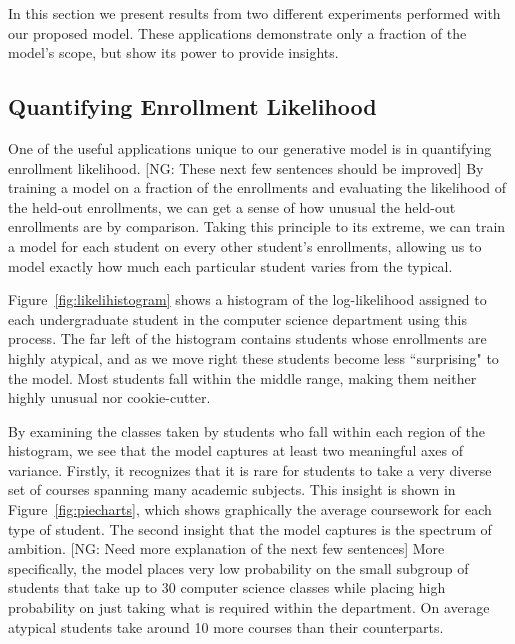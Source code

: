 \documentclass{edm_template}
\providecommand{\nvg}[1]{{\color{red} [NG: #1]}}
\begin{document}
In this section we present results from two different experiments performed with our proposed model. These applications demonstrate only a fraction of the model's scope, but show its power to provide insights.

\subsection{Quantifying Enrollment Likelihood}

One of the useful applications unique to our generative model is in quantifying enrollment likelihood. \nvg{These next few sentences should be improved} By training a model on a fraction of the enrollments and evaluating the likelihood of the held-out enrollments, we can get a sense of how unusual the held-out enrollments are by comparison. Taking this principle to its extreme, we can train a model for each student on every other student's enrollments, allowing us to model exactly how much each particular student varies from the typical. 

Figure~\ref{fig:likelihistogram} shows a histogram of the log-likelihood assigned to each undergraduate student in the computer science department using this process. The far left of the histogram contains students whose enrollments are highly atypical, and as we move right these students become less ``surprising" to the model. Most students fall within the middle range, making them neither highly unusual nor cookie-cutter.

By examining the classes taken by students who fall within each region of the histogram, we see that the model captures at least two meaningful axes of variance. Firstly, it recognizes that it is rare for students to take a very diverse set of courses spanning many academic subjects. This insight is shown in Figure~\ref{fig:piecharts}, which shows graphically the average coursework for each type of student. The second insight that the model captures is the spectrum of ambition. \nvg{Need more explanation of the next few sentences} More specifically, the model places very low probability on the small subgroup of students that take up to 30 computer science classes while placing high probability on just taking what is required within the department. On average atypical students take around 10 more courses than their counterparts. 
\end{document}
